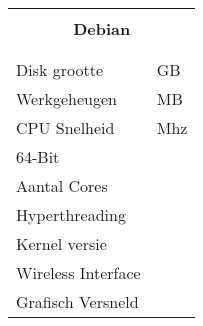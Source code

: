 \documentclass[a4paper,14pt]{extarticle}
\begin{document}

\begin{center}
	\begin{tabular}{ p{8cm}| p{8cm} }
		\multicolumn{2}{c}{\Huge\bf{\textsc{\hostname{}}}} \\
		\multicolumn{2}{c}{\Large\bf{Debian \debiancode{} \debianversion}}\\
	\multicolumn{2}{l}{\Large{\cpumodel{}}}  \\
	\multicolumn{2}{l}{\Large{\graphics{}}}  \\
	\hline
	\Large{Disk grootte} & \Large{\disksize{} GB}  \\
	\Large{Werkgeheugen} & \Large{\memsize{} MB} \\
	CPU Snelheid & \cpuspeed{} Mhz \\
	64-Bit & \bitssixtyfour{} \\
	Aantal Cores & \corecount{} \\
	Hyperthreading & \hyperthreading{} \\
	Kernel versie & {} \\
	Wireless Interface & \wireless \\
	Grafisch Versneld & \accelerated{} \\
	\hline
\end{tabular}
\end{center}
\end{document}
